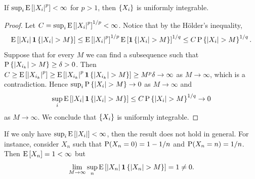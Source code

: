 \begin{proposition}
    If $\sup_i\E\sbrc{\abs{X_i}^p}<\infty$ for $p>1$, then $\set{X_i}$ is uniformly integrable. 
\end{proposition}
\begin{proof}
    Let $C = \sup_i\E\sbrc{\abs{X_i}^p}^{1/p}<\infty$. Notice that by the H\"older's inequality, 
    \begin{equation*}
        \E\sbrc{\abs{X_i}\one\set{\abs{X_i}>M}} \leq \E\sbrc{\abs{X_i}^p}^{1/p}\E\sbrc{\one\set{\abs{X_i}>M}}^{1/q} 
        \leq C\P\set{\abs{X_i}>M}^{1/q}. 
    \end{equation*}
    Suppose that for every $M$ we can find a subsequence such that $\P\set{\abs{X_{i_k}}>M}\geq\delta>0$. Then 
    $C\geq \E\sbrc{\abs{X_{i_k}}^p}\geq \E\sbrc{\abs{X_{i_k}}^p\one\set{\abs{X_{i_k}}>M}}\geq M^p\delta\to\infty$ 
    as $M\to\infty$, which is a contradiction. Hence $\sup_i\P\set{\abs{X_i}>M}\to 0$ as $M\to\infty$ and 
    \begin{equation*}
        \sup_i\E\sbrc{\abs{X_i}\one\set{\abs{X_i}>M}}\leq C\P\set{\abs{X_i}>M}^{1/q} \to 0
    \end{equation*}
    as $M\to\infty$. We conclude that $\set{X_i}$ is uniformly integrable. 
\end{proof}

\begin{example}
    If we only have $\sup_i\E\sbrc{\abs{X_i}}<\infty$, then the result does not hold 
    in general. For instance, consider $X_n$ such that $\P(X_n = 0) = 1-1/n$ and 
    $\P(X_n = n) = 1/n$. Then $\E\sbrc{X_n} = 1<\infty$ but 
    \begin{equation*}
        \lim_{M\to\infty}\sup_n\E\sbrc{\abs{X_n}\one\set{\abs{X_n}>M}} = 1 \neq 0. 
    \end{equation*}
\end{example}

